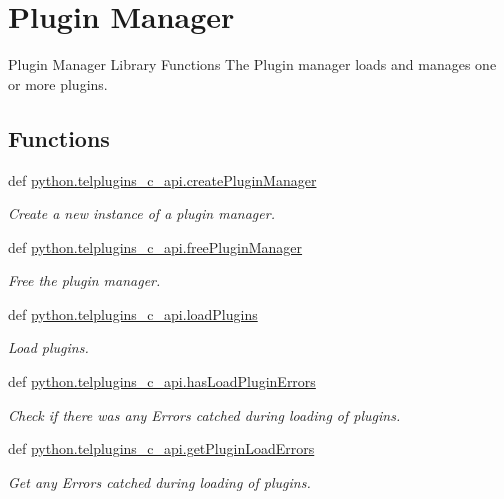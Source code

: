 \hypertarget{group__plugin__manager}{\section{Plugin Manager}
\label{group__plugin__manager}
}


Plugin Manager Library Functions The Plugin manager loads and manages one or more plugins.  


\subsection*{Functions}
\begin{DoxyCompactItemize}
\item 
def \hyperlink{group__plugin__manager_ga20d1fd0f6e3a77a1b80a2d32911cf2a5}{python.\-telplugins\-\_\-c\-\_\-api.\-create\-Plugin\-Manager}
\begin{DoxyCompactList}\small\item\em Create a new instance of a plugin manager. \end{DoxyCompactList}\item 
def \hyperlink{group__plugin__manager_ga5997ae323f97e21d4a6dd5303b0db53d}{python.\-telplugins\-\_\-c\-\_\-api.\-free\-Plugin\-Manager}
\begin{DoxyCompactList}\small\item\em Free the plugin manager. \end{DoxyCompactList}\item 
def \hyperlink{group__plugin__manager_gabd76ede2c1cd54e82c18be206a60de2e}{python.\-telplugins\-\_\-c\-\_\-api.\-load\-Plugins}
\begin{DoxyCompactList}\small\item\em Load plugins. \end{DoxyCompactList}\item 
def \hyperlink{group__plugin__manager_ga1a94ceee3d0d73657587523fd632f8a8}{python.\-telplugins\-\_\-c\-\_\-api.\-has\-Load\-Plugin\-Errors}
\begin{DoxyCompactList}\small\item\em Check if there was any Errors catched during loading of plugins. \end{DoxyCompactList}\item 
def \hyperlink{group__plugin__manager_ga12188a984b06e5e21a0a6b89493ee418}{python.\-telplugins\-\_\-c\-\_\-api.\-get\-Plugin\-Load\-Errors}
\begin{DoxyCompactList}\small\item\em Get any Errors catched during loading of plugins. \end{DoxyCompactList}\item 

\end{DoxyCompactItemize}
